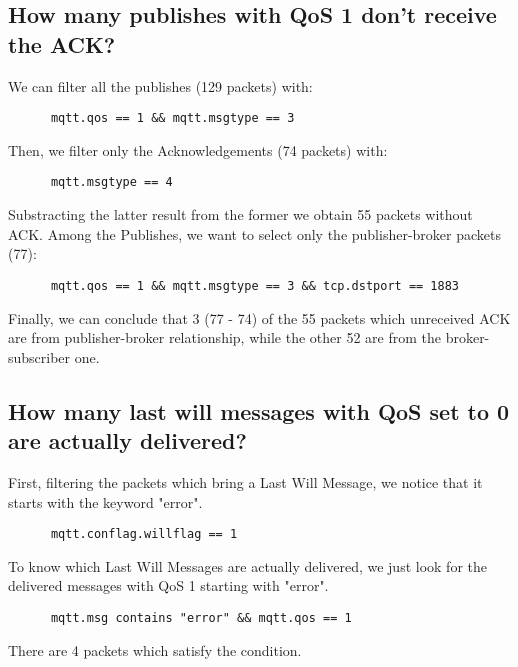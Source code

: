 \documentclass[12pt]{article}
\begin{document}
    \subsection{How many publishes with QoS 1 don’t receive the ACK?}
    We can filter all the publishes (129 packets) with:
    \begin{lstlisting}
      mqtt.qos == 1 && mqtt.msgtype == 3
    \end{lstlisting}
    Then, we filter only the Acknowledgements (74 packets) with:
    \begin{lstlisting}
      mqtt.msgtype == 4
    \end{lstlisting}
    Substracting the latter result from the former we obtain 55 packets without ACK.
    Among the Publishes, we want to select only the publisher-broker packets (77):
    \begin{lstlisting}
      mqtt.qos == 1 && mqtt.msgtype == 3 && tcp.dstport == 1883
    \end{lstlisting}
    Finally, we can conclude that 3 (77 - 74) of the 55 packets which unreceived ACK
    are from publisher-broker relationship, while the other 52 are from the broker-subscriber one. 
    \subsection{How many last will messages with QoS set to 0 are
    actually delivered?}
    First, filtering the packets which bring a Last Will Message, we notice that it starts with 
    the keyword "error".
    \begin{lstlisting}
      mqtt.conflag.willflag == 1
    \end{lstlisting}
    To know which Last Will Messages are actually delivered, we just look for the 
    delivered messages with QoS 1 starting with "error".
    \begin{lstlisting}
      mqtt.msg contains "error" && mqtt.qos == 1
    \end{lstlisting}
    There are 4 packets which satisfy the condition.
\end{document}
